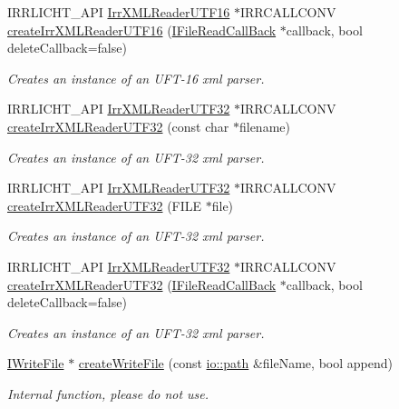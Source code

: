 \begin{DoxyCompactItemize}
I\+R\+R\+L\+I\+C\+H\+T\+\_\+\+A\+PI \hyperlink{namespaceirr_1_1io_a5eb4094dfd0d509e0cd8a9d1dd30a5b9}{Irr\+X\+M\+L\+Reader\+U\+T\+F16} $\ast$I\+R\+R\+C\+A\+L\+L\+C\+O\+NV \hyperlink{namespaceirr_1_1io_a9248bcaf5d5f394d7926c28bfc479d6c}{create\+Irr\+X\+M\+L\+Reader\+U\+T\+F16} (\hyperlink{classirr_1_1io_1_1IFileReadCallBack}{I\+File\+Read\+Call\+Back} $\ast$callback, bool delete\+Callback=false)
\begin{DoxyCompactList}\small\item\em Creates an instance of an U\+F\+T-\/16 xml parser. \end{DoxyCompactList}\item 
I\+R\+R\+L\+I\+C\+H\+T\+\_\+\+A\+PI \hyperlink{namespaceirr_1_1io_a70f411ff403636fb5c4e9becb090d5ec}{Irr\+X\+M\+L\+Reader\+U\+T\+F32} $\ast$I\+R\+R\+C\+A\+L\+L\+C\+O\+NV \hyperlink{namespaceirr_1_1io_ae05bf7ee342431ea8c98fb98e75b974a}{create\+Irr\+X\+M\+L\+Reader\+U\+T\+F32} (const char $\ast$filename)
\begin{DoxyCompactList}\small\item\em Creates an instance of an U\+F\+T-\/32 xml parser. \end{DoxyCompactList}\item 
I\+R\+R\+L\+I\+C\+H\+T\+\_\+\+A\+PI \hyperlink{namespaceirr_1_1io_a70f411ff403636fb5c4e9becb090d5ec}{Irr\+X\+M\+L\+Reader\+U\+T\+F32} $\ast$I\+R\+R\+C\+A\+L\+L\+C\+O\+NV \hyperlink{namespaceirr_1_1io_a4ea88dd2598272cff85357611a5e5938}{create\+Irr\+X\+M\+L\+Reader\+U\+T\+F32} (F\+I\+LE $\ast$file)
\begin{DoxyCompactList}\small\item\em Creates an instance of an U\+F\+T-\/32 xml parser. \end{DoxyCompactList}\item 
I\+R\+R\+L\+I\+C\+H\+T\+\_\+\+A\+PI \hyperlink{namespaceirr_1_1io_a70f411ff403636fb5c4e9becb090d5ec}{Irr\+X\+M\+L\+Reader\+U\+T\+F32} $\ast$I\+R\+R\+C\+A\+L\+L\+C\+O\+NV \hyperlink{namespaceirr_1_1io_a0f6ab4835641471a523c485c8d229eb2}{create\+Irr\+X\+M\+L\+Reader\+U\+T\+F32} (\hyperlink{classirr_1_1io_1_1IFileReadCallBack}{I\+File\+Read\+Call\+Back} $\ast$callback, bool delete\+Callback=false)
\begin{DoxyCompactList}\small\item\em Creates an instance of an U\+F\+T-\/32 xml parser. \end{DoxyCompactList}\item 
\mbox{\label{namespaceirr_1_1io_a5dec825b7f68ec19b252c9502ef501ec}} 
\hyperlink{classirr_1_1io_1_1IWriteFile}{I\+Write\+File} $\ast$ \hyperlink{namespaceirr_1_1io_a5dec825b7f68ec19b252c9502ef501ec}{create\+Write\+File} (const \hyperlink{namespaceirr_1_1io_ab1bdc45edb3f94d8319c02bc0f840ee1}{io\+::path} \&file\+Name, bool append)
\begin{DoxyCompactList}\small\item\em Internal function, please do not use. \end{DoxyCompactList}\end{DoxyCompactItemize}


